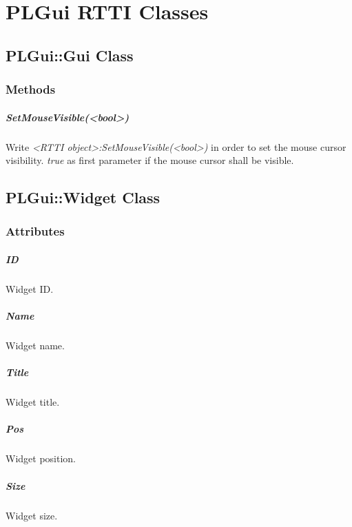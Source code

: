 \chapter{PLGui RTTI Classes}




\section{PLGui::Gui Class}


\subsection{Methods}

\paragraph{SetMouseVisible(<bool>)}
Write \emph{<RTTI object>:SetMouseVisible(<bool>)} in order to set the mouse cursor visibility. \emph{true} as first parameter if the mouse cursor shall be visible.




\section{PLGui::Widget Class}


\subsection{Attributes}

\paragraph{ID}
Widget ID.

\paragraph{Name}
Widget name.

\paragraph{Title}
Widget title.

\paragraph{Pos}
Widget position.

\paragraph{Size}
Widget size.

